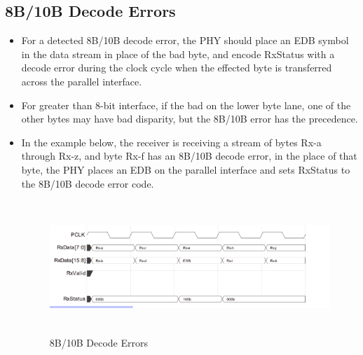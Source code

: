 \subsection{8B/10B Decode Errors} 
\begin{itemize}
    \item For a detected 8B/10B decode error, the PHY should place an EDB symbol in the data stream in place of the bad byte, and encode RxStatus with a decode error during the clock cycle when the effected byte is transferred across the parallel interface. 

    \item For greater than 8-bit interface, if the bad on the lower byte lane, one of the other bytes may have bad disparity, but the 8B/10B error has the precedence.

    \item In the example below, the receiver is receiving a stream of bytes Rx-a through Rx-z, and byte Rx-f has an 8B/10B decode error, in the place of that byte, the PHY places an EDB on the parallel interface and sets RxStatus to the 8B/10B decode error code.
\begin{figure}[H]
  \centering
  \includegraphics[width=130mm,height=50mm]{images/clk_diagram/dr.png}
  \caption{8B/10B Decode Errors}
  \label{lane}
\end{figure}
\end{itemize}
